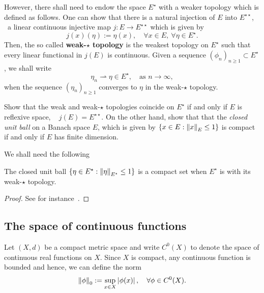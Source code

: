 However, there shall need to endow the space $E^{\star}$ with a weaker topology which is defined as follows. One can show that there is a natural injection of $E$ into $E^{\star\star}$, \ie~a linear continuous injective map $j\colon E\to E^{\star\star}$ which is given by
\begin{displaymath}
  j(x)(\eta):=\eta(x), \quad\forall x\in E,\ \forall\eta\in E^{\star}.
\end{displaymath}
Then, the so called \textbf{weak-$\star$ topology} is the weakest topology on $E^{\star}$ such that every linear functional in $j(E)$ is continuous. Given a sequence ${(\phi_{n})}_{n\geq 1}\subset E^{\star}$, we shall write
\begin{displaymath}
  \eta_{n}\rightharpoonup \eta\in E^{\star}, \quad\text{as } n\to \infty,
\end{displaymath}
when the sequence ${(\eta_{n})}_{n\geq 1}$ converges to $\eta$ in the weak-$\star$ topology.

\begin{exercise}
  Show that the weak and weak-$\star$ topologies coincide on $E^{\star}$ if and only if $E$ is reflexive space, \ie~ $j(E)=E^{\star\star}$. On the other hand, show that that the \emph{closed unit ball} on a Banach space $E$, which is given by $\{x\in E : \left\|{x}\right\|_{E}\leq 1\}$ is compact if and only if $E$ has finite dimension.
\end{exercise}


We shall need the following
\begin{theorem}\label{thm:Banach-Alaoglu}
  The closed unit ball $\{\eta\in E^{\star} : \left\|{\eta}\right\|_{E^{\star}}\leq 1\}$ is a compact set when $E^{\star}$ is with its weak-$\star$ topology.
\end{theorem}

\begin{proof}
  See for instance~\cite[Theorem 8.10]{EinsiedlerWardFunctionalAnalysisBook}.
\end{proof}

\subsection{The space of continuous functions}\label{sec:space-cont-functions}

Let $(X,d)$ be a compact metric space and write $C^{0}(X)$ to denote the space of continuous real functions on $X$. Since $X$ is compact, any continuous function is bounded and hence, we can define the norm
\begin{displaymath}
  \left\|{\phi}\right\|_{0}:=\sup_{x\in X} \left\lvert{\phi(x)}\right\rvert, \quad\forall \phi\in C^{0}(X).
\end{displaymath}

